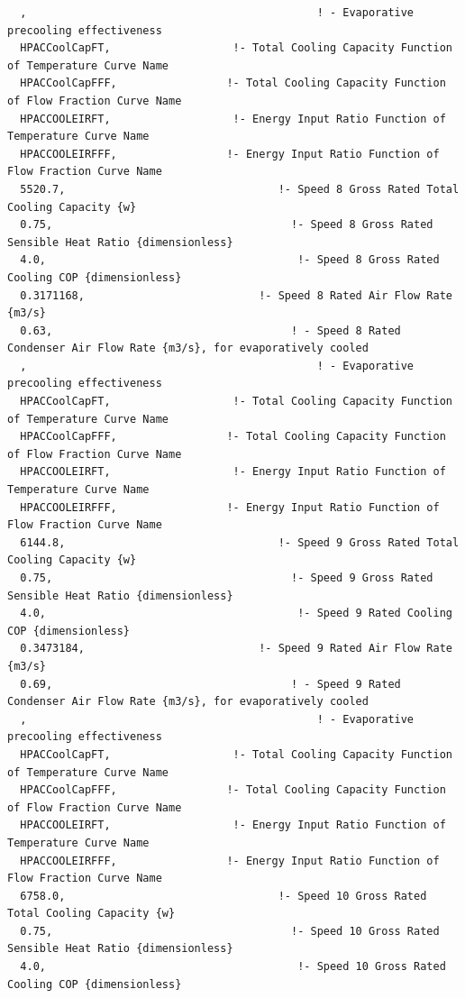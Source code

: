 \begin{lstlisting}
  ,                                             ! - Evaporative precooling effectiveness
  HPACCoolCapFT,                   !- Total Cooling Capacity Function of Temperature Curve Name
  HPACCoolCapFFF,                 !- Total Cooling Capacity Function of Flow Fraction Curve Name
  HPACCOOLEIRFT,                   !- Energy Input Ratio Function of Temperature Curve Name
  HPACCOOLEIRFFF,                 !- Energy Input Ratio Function of Flow Fraction Curve Name
  5520.7,                                 !- Speed 8 Gross Rated Total Cooling Capacity {w}
  0.75,                                     !- Speed 8 Gross Rated Sensible Heat Ratio {dimensionless}
  4.0,                                       !- Speed 8 Gross Rated Cooling COP {dimensionless}
  0.3171168,                           !- Speed 8 Rated Air Flow Rate {m3/s}
  0.63,                                     ! - Speed 8 Rated Condenser Air Flow Rate {m3/s}, for evaporatively cooled
  ,                                             ! - Evaporative precooling effectiveness
  HPACCoolCapFT,                   !- Total Cooling Capacity Function of Temperature Curve Name
  HPACCoolCapFFF,                 !- Total Cooling Capacity Function of Flow Fraction Curve Name
  HPACCOOLEIRFT,                   !- Energy Input Ratio Function of Temperature Curve Name
  HPACCOOLEIRFFF,                 !- Energy Input Ratio Function of Flow Fraction Curve Name
  6144.8,                                 !- Speed 9 Gross Rated Total Cooling Capacity {w}
  0.75,                                     !- Speed 9 Gross Rated Sensible Heat Ratio {dimensionless}
  4.0,                                       !- Speed 9 Rated Cooling COP {dimensionless}
  0.3473184,                           !- Speed 9 Rated Air Flow Rate {m3/s}
  0.69,                                     ! - Speed 9 Rated Condenser Air Flow Rate {m3/s}, for evaporatively cooled
  ,                                             ! - Evaporative precooling effectiveness
  HPACCoolCapFT,                   !- Total Cooling Capacity Function of Temperature Curve Name
  HPACCoolCapFFF,                 !- Total Cooling Capacity Function of Flow Fraction Curve Name
  HPACCOOLEIRFT,                   !- Energy Input Ratio Function of Temperature Curve Name
  HPACCOOLEIRFFF,                 !- Energy Input Ratio Function of Flow Fraction Curve Name
  6758.0,                                 !- Speed 10 Gross Rated Total Cooling Capacity {w}
  0.75,                                     !- Speed 10 Gross Rated Sensible Heat Ratio {dimensionless}
  4.0,                                       !- Speed 10 Gross Rated Cooling COP {dimensionless}

\end{lstlisting}
